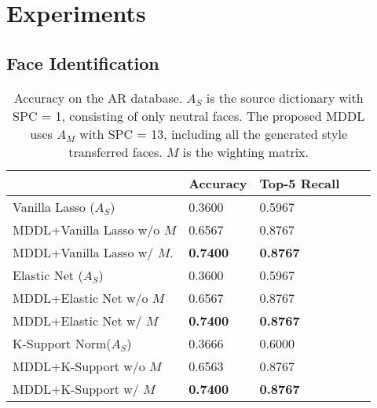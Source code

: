 \documentclass{article}
\begin{document}
\section{Experiments}
\label{sec:experiments}

\subsection{Face Identification}

\begin{table}[!htb]
\caption{Accuracy on the AR database. $A_S$ is the source dictionary with SPC = 1, consisting of only neutral faces. The proposed MDDL uses $A_M$ with SPC = 13, including all the generated style transferred faces. $M$ is the wighting matrix.}
\label{Table1}
\begin{center}
\begin{tabular}{|l|l|l|l|l|}
\hline
                              & Accuracy & Top-5 Recall        \\ \hline
Vanilla Lasso ($A_S$)         & 0.3600   & 0.5967              \\ \hline
MDDL+Vanilla Lasso w/o $M$    & 0.6567   & 0.8767              \\ \hline
MDDL+Vanilla Lasso w/ $M$.     & \bf{0.7400}   & \bf{0.8767}    \\ \hline
Elastic Net ($A_S$)           & 0.3600   & 0.5967              \\ \hline
MDDL+Elastic Net w/o $M$      & 0.6567   & 0.8767              \\ \hline
MDDL+Elastic Net w/ $M$        & \bf{0.7400}   & \bf{0.8767}    \\ \hline
K-Support Norm($A_S$)         & 0.3666    & 0.6000             \\ \hline
MDDL+K-Support w/o $M$        & 0.6563   & 0.8767              \\ \hline
MDDL+K-Support w/ $M$          & \bf{0.7400}   & \bf{0.8767}         \\ \hline 
\end{tabular}
\end{center}
\end{table}
\end{document}

